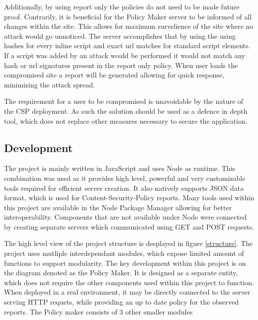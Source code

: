 \begin{description}
Additionally, by using report only the policies do not need to be made future proof. 
Contrarily, it is beneficial for the Policy Maker server to be informed of all changes within the site.
This allows for maximum survelience of the site where no attack would go unnoticed.
The server accomplishes that by using the using hashes for every inline script and exact url matches for standard script elements.
If a script was added by an attack would be performed it would not match any hash or url signatures present in the report only policy.
When user loads the compromised site a report will be generated allowing for quick response, minimizing the attack spread.

The requirement for a user to be compromised is unavoidable by the nature of the CSP deployment.
As such the solution should be used as a defence in depth tool, which does not replace other measures necessary to secure the application.

\subsection{Development}

The project is mainly written in JavaScript and uses Node as runtime.
This combination was used as it provides high level, powerful and very customizable tools required for efficient server creation.
It also natively supports JSON data format, which is used for Content-Security-Policy reports.
Many tools used within this project are available in the Node Package Manager allowing for better interoperability.
Components that are not available under Node were connected by creating separate servers which communicated using GET and POST requests.

The high level view of the project structure is desplayed in figure \ref{structure}.
The project uses mutliple interdependant modules, which expose limited amount of functions to support modularity.
The key development within this project is on the diagram denoted as the Policy Maker.
It is designed as a separate entity, which does not require the other components used within this project to function.
When deployed in a real environment, it may be directly connected to the server serving HTTP requets, while providing an up to date policy for the observed reports.
The Policy maker consists of 3 other smaller modules 
\end{description}
